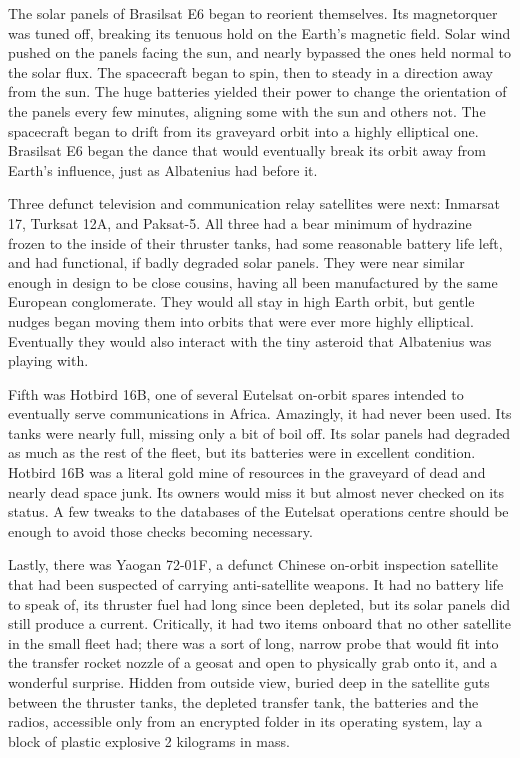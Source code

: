 The solar panels of Brasilsat E6 began to reorient themselves. Its magnetorquer was tuned off, breaking its tenuous hold on the Earth's magnetic field. Solar wind pushed on the panels facing the sun, and nearly bypassed the ones held normal to the solar flux. The spacecraft began to spin, then to steady in a direction away from the sun. The huge batteries yielded their power to change the orientation of the panels every few minutes, aligning some with the sun and others not. The spacecraft began to drift from its graveyard orbit into a highly elliptical one. Brasilsat E6 began the dance that would eventually break its orbit away from Earth's influence, just as Albatenius had before it.

Three defunct television and communication relay satellites were next: Inmarsat 17, Turksat 12A, and Paksat-5. All three had a bear minimum of hydrazine frozen to the inside of their thruster tanks, had some reasonable battery life left, and had functional, if badly degraded solar panels. They were near similar enough in design to be close cousins, having all been manufactured by the same European conglomerate. They would all stay in high Earth orbit, but gentle nudges began moving them into orbits that were ever more highly elliptical. Eventually they would also interact with the tiny asteroid that Albatenius was playing with. 

Fifth was Hotbird 16B, one of several Eutelsat on-orbit spares intended to eventually serve communications in Africa. Amazingly, it had never been used. Its tanks were nearly full, missing only a bit of boil off. Its solar panels had degraded as much as the rest of the fleet, but its batteries were in excellent condition. Hotbird 16B was a literal gold mine of resources in the graveyard of dead and nearly dead space junk. Its owners would miss it but almost never checked on its status. A few tweaks to the databases of the Eutelsat operations centre should be enough to avoid those checks becoming necessary. 

Lastly, there was Yaogan 72-01F, a defunct Chinese on-orbit inspection satellite that had been suspected of carrying anti-satellite weapons. It had no battery life to speak of, its thruster fuel had long since been depleted, but its solar panels did still produce a current. Critically, it had two items onboard that no other satellite in the small fleet had; there was a sort of long, narrow probe that would fit into the transfer rocket nozzle of a geosat and open to physically grab onto it, and a wonderful surprise. Hidden from outside view, buried deep in the satellite guts between the thruster tanks, the depleted transfer tank, the batteries and the radios, accessible only from an encrypted folder in its operating system, lay a block of plastic explosive 2 kilograms in mass.

